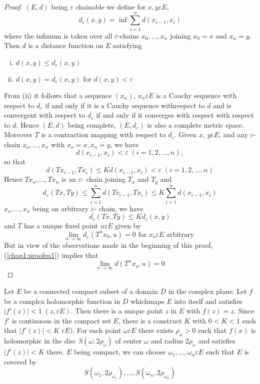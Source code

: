 \begin{proof}
  $(E,d)$ being $\varepsilon$ chainable we define for $x,y \varepsilon E$,
  $$
  d_{\varepsilon} (x,y) = \inf \sum_{i=1}^{n} d (x_{i-1}, x_i)
  $$
  where the infimum is taken over all $\varepsilon$-chains $x_0, \ldots,
  x_n$ joining $x_0 = x$ and $x_n = y$. Then $d$ is a distance
  function on $E$ satisfying  
  \begin{enumerate}[i)]
  \item $d (x,y) \leq d_{\varepsilon} (x,y)$
  \item $d (x,y) = d_{\varepsilon} (x,y) \text{ for } d (x,y) < \varepsilon$
  \end{enumerate} 
  From (ii) it follows that a sequence $(x_n)$, $x_n \varepsilon E$ is a Cauchy
  sequence with respect to $d_{\varepsilon}$ if and only if it is a Cauchy
  sequence with\pageoriginale respect to $d$ and is convergent with respect to
  $d_{\varepsilon}$ if and only if it converges with respect with respect to
  $d$. Hence $(E,d)$ being complete, $(E, d_{\varepsilon})$ is also a complete
  metric space. Moreover $T$ is a contraction mapping with respect to
  $d_{\varepsilon}$. Given $x$, $y \varepsilon E$, and any
  $\varepsilon$-chain $x_o, \ldots, 
  x_n$ with $x_o = x,x_n = y$, we have  
  $$
  d (x_{i-1}, x_i) < \varepsilon \; (i=1, 2, \ldots, n),
  $$
  so that
  $$
  d (Tx_{i-1}, Tx_i)\leq K d(x_{i-1}, x_i) < \varepsilon \; (i=1, 2, \ldots, n)
  $$
  Hence $Tx_o, \ldots, Tx_n$ is an $\varepsilon$- chain joining $T_x$
  and $T_y$ and  
  $$
  d_{\varepsilon} (Tx, Ty) \leq \sum_{i=1}^{n} d (Tc_{i-1}, Tx_i) \leq K
  \sum_{i=1}^{n} d(x_{i-1}, x_i) 
  $$
  $x_o, \ldots, x_n$ being an arbitrary $\varepsilon$- chain, we have
  $$
  d_{\varepsilon}(Tx, Ty) \leq K d_{\varepsilon} (x,y)
  $$
  and $T$ has a unique fixed point $u \varepsilon E$ given by 
  \begin{equation}
    \lim_{n \to \infty} d_\varepsilon (T^n x_0 , u)=0 \text{ for } x_o
    \varepsilon E \text{ arbitrary } \tag{1}\label{chap1:proofeq1} 
  \end{equation}
  But in view of the observations made in the beginning of this proof,
  (\ref{chap1:proofeq1}) implies that 
  $$
  \lim_{n \to \infty} d (T^n x_o, u)=0
  $$
\end{proof}

\begin{example*}
  Let $E$ be a connected compact subset of a domain $D$ in the complex
  plane. Let $f$ be a complex holomorphic function in $D$
  which\pageoriginale maps 
  $E$ into itself and satisfies $|f' (z)| < 1 \;  (z, \varepsilon E)$. Then
  there is a 
  unique point $z$ in $E$ with $f(z) =z$. Since $f'$ is continuous in
  the compact set $E$, there is a construct $K$ with $0 < K < 1$ such
  that $|f'(z)| < K \; \varepsilon E)$. For each point $\omega
  \varepsilon E$ there 
  exists $\rho_{\omega} > 0$ such that $f(x)$ is holomorphic in the
  disc $S (\omega, 2 \rho_{\omega})$ of center $\omega$ and radius $ 2
  \rho_{\omega}$ and satisfies $|f' (z)|< K$ there. $E$ being compact,
  we can choose $\omega_1, \ldots, \omega_n \varepsilon E$ such that $E$ is
  covered by 
  $$
  S(\omega_1, 2 \rho_{\omega_{1}}), \ldots, S (\omega_n, 2 \rho_{\omega_{n}})
  $$  
\end{example*}

